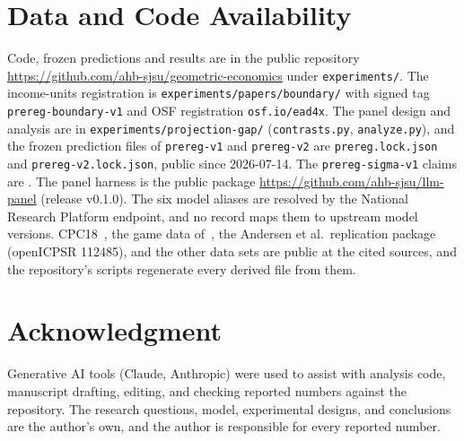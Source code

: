 \documentclass[journal]{IEEEtran}
\begin{document}
\section*{Data and Code Availability}
\sloppy
Code, frozen predictions and results are in the public repository \url{https://github.com/ahb-sjsu/geometric-economics} under \texttt{experiments/}.
The income-units registration is \texttt{experiments/papers/boundary/} with signed tag \texttt{prereg-boundary-v1} and OSF registration \texttt{osf.io/ead4x}. %
The panel design and analysis are in \texttt{experiments/projection-gap/} (\texttt{contrasts.py}, \texttt{analyze.py}), and the frozen prediction files of \texttt{prereg-v1} and \texttt{prereg-v2} are \texttt{prereg.lock.json} and \texttt{prereg-v2.lock.json}, public since 2026-07-14.
The \texttt{prereg-sigma-v1} claims are .
The panel harness is the public package \url{https://github.com/ahb-sjsu/llm-panel} (release v0.1.0).
The six model aliases are resolved by the National Research Platform endpoint, and no record maps them to upstream model versions.
CPC18~\cite{cpc18data}, the game data of~\cite{wright2017}, the Andersen et al.\ replication package (openICPSR 112485), and the other data sets are public at the cited sources, and the repository's scripts regenerate every derived file from them.

\section*{Acknowledgment}
Generative AI tools (Claude, Anthropic) were used to assist with analysis code, manuscript drafting, editing, and checking reported numbers against the repository.
The research questions, model, experimental designs, and conclusions are the author's own, and the author is responsible for every reported number.
\end{document}
